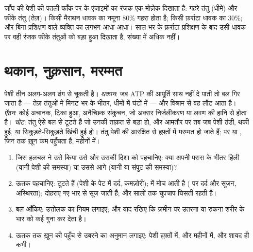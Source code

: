 \begin{example}[पेशी की बायोप्सी पढ़ना]\label{ex:g10:muscles-and-joints:biopsy}
जाँघ की पेशी की पतली फाँक पर  के एंजाइमों का रंजक एक मोज़ेक
दिखाता है: गहरे तंतु (धीमे) और फीके तंतु (तेज़)। किसी मैराथन धावक का
नमूना 80\% गहरा होता है; किसी फ़र्राटा धावक का 30\%; और बिना प्रशिक्षण
वाले व्यक्ति का लगभग आधा-आधा। साल भर के फ़र्राटा प्रशिक्षण के बाद उसी
धावक पर वही रंजक फीके तंतुओं को बड़ा हुआ दिखाता है, संख्या में अधिक नहीं।
\end{example}

\section{थकान, नुक़सान, मरम्मत}

\begin{proposition}[पेशी की सीमाएँ]\label{prop:g10:muscles-and-joints:limits}
पेशी तीन अलग-अलग ढंग से चूकती है। \emph{थकान}: जब ATP की आपूर्ति साथ नहीं
दे पाती तो बल गिर जाता है --- तेज़ तंतुओं में मिनट भर के भीतर, धीमों में
घंटों में --- और विश्राम से वह लौट आता है। \emph{ऐंठन}: कोई अचानक, टिका
हुआ, अनैच्छिक संकुचन, जो अक्सर निर्जलीकरण या लवण की हानि से होता है।
\emph{चोट}: तंतु ऐसे बल से टूटते हैं जो उनकी ताक़त से बड़ा हो, और आमतौर
पर तब जब पेशी ठंडी, थकी हुई, या सिकुड़ते-सिकुड़ते खिंची हुई हो। तंतु पेशी
की आरक्षित  से हफ़्तों में मरम्मत हो जाते हैं; पर  या ,
जिन तक ख़ून कम पहुँचता है, महीनों में।
\end{proposition}
\admitted

\begin{method}[किसी पेशी-कंकाल चोट का विश्लेषण]\label{met:g10:muscles-and-joints:analyse}
\begin{enumerate}
  \item जिस हलचल ने उसे किया उसे और उसकी दिशा को पहचानिए: क्या  अपनी
        परास के भीतर हिली (यानी पेशी की समस्या) या उससे आगे (यानी 
        या संपुट की समस्या)?
  \item ऊतक पहचानिए:  टूटते हैं (पेशी के पेट में दर्द,
        कमज़ोरी);  में मोच आती है ( पर दर्द और सूजन,
        अस्थिरता);  दोहराए गए भार से सूज जाती हैं; और 
        सालों तक चुपचाप घिसती रहती है।
  \item बल आँकिए: उत्तोलक का नियम लगाइए; और याद रखिए कि ज़मीन पर उतरना
        या रुकना शरीर के भार को कई गुना कर देता है।
  \item ऊतक तक ख़ून की पहुँच से उबरने का अनुमान लगाइए: पेशी हफ़्तों में,
         और  महीनों में, और  शायद ही कभी।
\end{enumerate}
\end{method}

